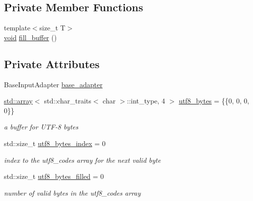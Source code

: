 \subsection*{Private Member Functions}
\begin{DoxyCompactItemize}
\item 
{\footnotesize template$<$size\+\_\+t T$>$ }\\\hyperlink{namespacenlohmann_1_1detail_a59fca69799f6b9e366710cb9043aa77d}{void} \hyperlink{classnlohmann_1_1detail_1_1wide__string__input__adapter_a1e797f94449c5c3e68ab468d8caf0db6}{fill\+\_\+buffer} ()
\end{DoxyCompactItemize}
\subsection*{Private Attributes}
\begin{DoxyCompactItemize}
\item 
Base\+Input\+Adapter \hyperlink{classnlohmann_1_1detail_1_1wide__string__input__adapter_a6951ed130bc49fbee6e434b62ed187ac}{base\+\_\+adapter}
\item 
\hyperlink{namespacenlohmann_1_1detail_a1ed8fc6239da25abcaf681d30ace4985af1f713c9e000f5d3f280adbd124df4f5}{std\+::array}$<$ std\+::char\+\_\+traits$<$ char $>$\+::int\+\_\+type, 4 $>$ \hyperlink{classnlohmann_1_1detail_1_1wide__string__input__adapter_af6bded96214b2fe8edd142d92141550e}{utf8\+\_\+bytes} = \{\{0, 0, 0, 0\}\}
\begin{DoxyCompactList}\small\item\em a buffer for U\+T\+F-\/8 bytes \end{DoxyCompactList}\item 
std\+::size\+\_\+t \hyperlink{classnlohmann_1_1detail_1_1wide__string__input__adapter_a2a1884713fedff6c17cdbbe63070d1ac}{utf8\+\_\+bytes\+\_\+index} = 0
\begin{DoxyCompactList}\small\item\em index to the utf8\+\_\+codes array for the next valid byte \end{DoxyCompactList}\item 
std\+::size\+\_\+t \hyperlink{classnlohmann_1_1detail_1_1wide__string__input__adapter_a8966550e615e62978b01d3a252b9c649}{utf8\+\_\+bytes\+\_\+filled} = 0
\begin{DoxyCompactList}\small\item\em number of valid bytes in the utf8\+\_\+codes array \end{DoxyCompactList}\end{DoxyCompactItemize}


